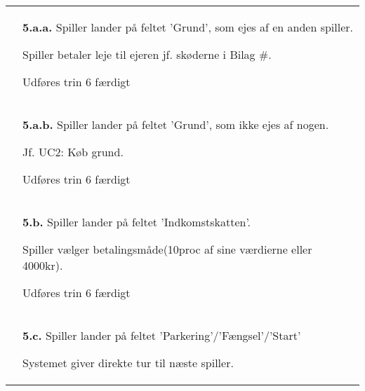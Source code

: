 \documentclass[class=article, crop=false]{standalone}
\begin{document}
\begin{table}[H]
\begin{tabularx}{\textwidth}{|l|X|}
                              & \textbf{5.a.a.} Spiller lander på feltet
                                'Grund', som ejes af en anden spiller.
                                \begin{enumerate} \begin{tabenum}
                                  \item Spiller betaler leje til ejeren
                                        jf. skøderne i Bilag \#.
                                  \item Udføres trin 6 færdigt
                                \end{tabenum} \end{enumerate}
                                \\
                            & \textbf{5.a.b.} Spiller lander på feltet
                                'Grund', som ikke ejes af nogen.
                            \begin{enumerate} \begin{tabenum}
                                  \item Jf. UC2: Køb grund.
                                  \item Udføres trin 6 færdigt
                            \end{tabenum} \end{enumerate}
                            \\


                            & \textbf{5.b.} Spiller lander på feltet
                            'Indkomstskatten'.
                            \begin{enumerate} \begin{tabenum}
                              \item Spiller vælger betalingsmåde(10proc af sine værdierne eller 4000kr).
                              \item Udføres trin 6 færdigt
                            \end{tabenum} \end{enumerate}
                            \\


                            & \textbf{5.c.} Spiller lander på feltet 'Parkering'/'Fængsel'/'Start'
                            \begin{enumerate} \begin{tabenum}
                                                  \item Systemet giver direkte tur til næste spiller.
                            \end{tabenum} \end{enumerate}
                            \\



\end{tabularx}
\end{table}
\end{document}
